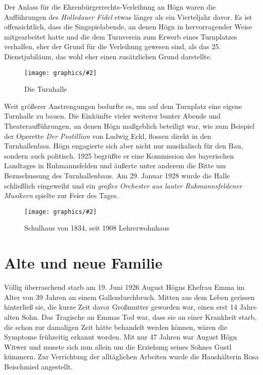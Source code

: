 \documentclass{book}
\newcommand{\zitat}[1]{\textit{#1}}
\newcommand{\img}[2][width=\linewidth]{\noindent\texttt{[image: graphics/\#2]}}
\begin{document}
Der Anlass für die Ehrenbürgerrechts-Verleihung an Högn waren die
Aufführungen des \textit{Holledauer Fidel} etwas länger als ein
Vierteljahr davor. Es ist offensichtlich, dass die Singspielabende, an
denen Högn in hervorragender Weise mitgearbeitet hatte und die dem
Turnverein zum Erwerb eines Turnplatzes verhalfen, eher der Grund für
die Verleihung gewesen sind, als das 25. Dienstjubiläum, das wohl eher
einen zusätzlichen Grund darstellte.

\begin{figure}
\img{Turnhalle}
\caption{Die Turnhalle}
\end{figure}

Weit größerer Anstrengungen bedurfte es, um auf dem Turnplatz eine
eigene Turnhalle zu bauen. Die Einkünfte vieler weiterer bunter Abende
und Theateraufführungen, an denen Högn maßgeblich beteiligt war, wie
zum Beispiel der Operette \textit{Der Postillion} von Ludwig Eckl,
flossen direkt in den Turnhallenbau. Högn engagierte sich aber nicht
nur musikalisch für den Bau, sondern auch politisch. 1925 begrüßte er
eine Kommission des bayerischen Landtages in Ruhmannsfelden und äußerte
unter anderem die Bitte um Bezuschussung des Turnhallenbaus. Am 29.
Januar 1928 wurde die Halle schließlich eingeweiht und ein
\zitat{großes Orchester aus lauter Ruhmannsfeldener Musikern} spielte zur Feier des Tages.

\begin{figure}
\img{Schulhaus-1834}
\caption{Schulhaus von 1834, seit 1908 Lehrerwohnhaus}
\end{figure}

\section{Alte und neue Familie}

Völlig überraschend starb am 19. Juni 1926 August Högns Ehefrau Emma im
Alter von 39 Jahren an einem Gallendurchbruch. Mitten aus dem Leben
gerissen hinterließ sie, die kurze Zeit davor Großmutter geworden
war, einen erst 14 Jahre alten Sohn. Das Tragische an Emmas Tod war,
dass sie an einer Krankheit starb, die schon zur damaligen Zeit hätte
behandelt werden können, wären die Symptome frühzeitig erkannt worden.
Mit nur 47 Jahren war August Högn Witwer und musste sich nun allein um
die Erziehung seines Sohnes Gustl kümmern. Zur Verrichtung der
alltäglichen Arbeiten wurde die Haushälterin Rosa Beischmied
angestellt.
\end{document}
